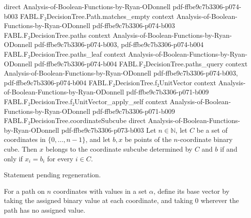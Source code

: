 \begin{theorem}
  {direct}
  {Analysis-of-Boolean-Functions-by-Ryan-ODonnell}
  {pdf-ffbe9c7b3306-p074-b003}
\proofstep
  {FABL.F₂DecisionTree.Path.matches_empty}
  {context}
  {Analysis-of-Boolean-Functions-by-Ryan-ODonnell}
  {pdf-ffbe9c7b3306-p074-b003}
\proofstep
  {FABL.F₂DecisionTree.paths}
  {context}
  {Analysis-of-Boolean-Functions-by-Ryan-ODonnell}
  {pdf-ffbe9c7b3306-p074-b003,
    pdf-ffbe9c7b3306-p074-b004}
\proofstep
  {FABL.F₂DecisionTree.paths_leaf}
  {context}
  {Analysis-of-Boolean-Functions-by-Ryan-ODonnell}
  {pdf-ffbe9c7b3306-p074-b004}
\proofstep
  {FABL.F₂DecisionTree.paths_query}
  {context}
  {Analysis-of-Boolean-Functions-by-Ryan-ODonnell}
  {pdf-ffbe9c7b3306-p074-b003,
    pdf-ffbe9c7b3306-p074-b004}
\proofstep
  {FABL.F₂DecisionTree.f₂UnitVector}
  {context}
  {Analysis-of-Boolean-Functions-by-Ryan-ODonnell}
  {pdf-ffbe9c7b3306-p071-b009}
\proofstep
  {FABL.F₂DecisionTree.f₂UnitVector_apply_self}
  {context}
  {Analysis-of-Boolean-Functions-by-Ryan-ODonnell}
  {pdf-ffbe9c7b3306-p071-b009}
\proofstep
  {FABL.F₂DecisionTree.coordinateSubcube}
  {direct}
  {Analysis-of-Boolean-Functions-by-Ryan-ODonnell}
  {pdf-ffbe9c7b3306-p073-b003}
Let $n\in\mathbb N$, let $C$ be a set of coordinates in $\{0,\ldots,n-1\}$, and let
$b,x$ be points of the $n$-coordinate binary cube. Then $x$ belongs to the coordinate
subcube determined by $C$ and $b$ if and only if $x_i=b_i$ for every $i\in C$.
\end{theorem}

\begin{theorem}
\leanok
{}
Statement pending regeneration.
\end{theorem}

\begin{definition}
\leanok
{}
For a path on $n$ coordinates with values in a set $\alpha$, define its base vector by
taking the assigned binary value at each coordinate, and taking $0$ wherever the path
has no assigned value.
\end{definition}

